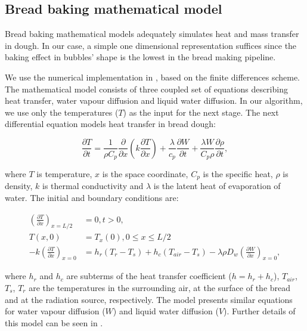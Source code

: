 \documentclass[final,5p,times]{elsarticle}
\begin{document}
\subsection{Bread baking mathematical model}
Bread baking mathematical models adequately simulates heat and mass transfer in dough. In our case, a simple one dimensional representation suffices \cite{Powathil2004,Purlis2010}  since the baking effect in bubbles' shape is the lowest in the bread making pipeline. 

We use the numerical implementation in \cite{Powathil2004}, based on the finite differences scheme.
The mathematical model consists of three coupled set of equations describing heat transfer, water vapour diffusion and liquid water diffusion. In our algorithm,  we use only the temperatures ($T$) as the input for the next stage. The next differential equation models heat transfer in bread dough:

\begin{equation}
\frac{\partial T}{\partial t} = \frac{1}{\rho C_{p}} \frac{\partial}{\partial x} \left ( k \frac{\partial T}{\partial x} \right ) + \frac{\lambda}{c_{p}} \frac{\partial W}{\partial t}+\frac{\lambda W}{ C_{p} \rho}\frac{\partial \rho}{\partial t},
\end{equation}


\noindent where $T$ is temperature, $x$ is the space coordinate, $C_{p}$ is the specific heat, $\rho$ is density, $k$ is thermal conductivity and $\lambda$ is the latent heat of evaporation of water. The initial and boundary conditions are:

\begin{align}
\left ( \frac{\partial T}{\partial x} \right )_{x=L/2} &= 0 , t > 0, \\
T(x,0) &= T_{x}(0), 0\le x \le L/2\\
-k \left ( \frac{\partial T}{\partial x} \right )_{x=0} &= h_{r}(T_{r}-T_{s}) + h_{c}(T_{air}-T_{s}) - \lambda \rho D_{w} \left (\frac{\partial W}{\partial x} \right )_{x=0},
\end{align}

\noindent where $h_{r}$ and $h_{c}$ are subterms of the heat transfer coefficient ($h = h_{r}+h_{c}$), $T_{air}$, $T_{s}$, $T_{r}$ are the temperatures in the surrounding air, at the surface of the bread and at the radiation source, respectively. The model presents similar equations for water vapour diffusion ($W$) and  liquid water diffusion ($V$). Further details of this model can be seen in \cite{Powathil2004}.
\end{document}
